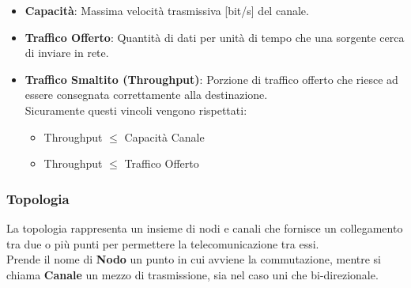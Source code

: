 \documentclass[12pt]{article}
\begin{document}
\begin{itemize}
  \item \textbf{Capacità}: Massima velocità trasmissiva [bit/s] del canale.\\
  \item \textbf{Traffico Offerto}: Quantità di dati per unità di tempo che una sorgente cerca di inviare in rete.\\
  \item \textbf{Traffico Smaltito (Throughput)}: Porzione di traffico offerto che riesce ad essere consegnata correttamente alla destinazione.\\
  Sicuramente questi vincoli vengono rispettati:
  \begin{itemize}
    \item Throughput $\leq$ Capacità Canale
    \item Throughput $\leq$ Traffico Offerto
  \end{itemize}
\end{itemize}
\subsubsection{Topologia}
La topologia rappresenta un insieme di nodi e canali che fornisce un collegamento tra due o più punti per permettere la telecomunicazione tra essi.\\
Prende il nome di \textbf{Nodo} un punto in cui avviene la commutazione, mentre si chiama \textbf{Canale} un mezzo di trasmissione, sia nel caso uni che bi-direzionale.
\end{document}
